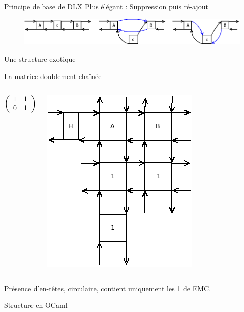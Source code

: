 \documentclass{beamer}
\begin{document}
\begin{frame}{Principe de base de DLX}
Plus élégant : Suppression puis ré-ajout
\begin{figure}[h]
\begin{center}
\includegraphics[scale=0.3]{../imports/delete.png}
\end{center}
\end{figure}
\end{frame}

\begin{frame}{Une structure exotique}

La matrice doublement chaînée

 \begin{columns}
\begin{center}$
\left(\begin{array}{ c c c c c }
   1 & 1 \\
   0 & 1 
  \end{array}\right)$
\end{center}

\includegraphics[scale=0.4]{../imports/dlx_matrice.png}
 \end{columns}

Présence d'en-têtes, circulaire, contient uniquement les 1 de EMC.
\end{frame}


\begin{frame}{Structure en OCaml}
\scalebox{0.8}{

}
\end{frame}
\end{document}
